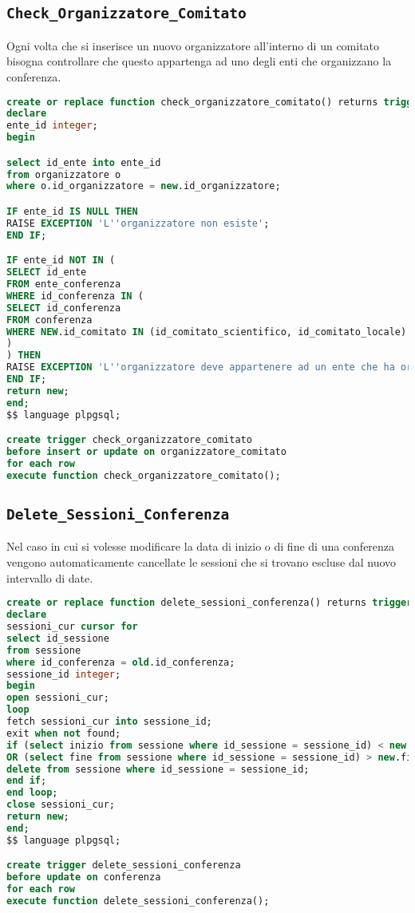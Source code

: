 \subsection{\texttt{Check\_Organizzatore\_Comitato}}
Ogni volta che si inserisce un nuovo organizzatore all'interno di un comitato bisogna controllare che questo appartenga ad uno degli enti che organizzano la conferenza.
\begin{lstlisting}[language=SQL, style=mystyle, caption={\texttt{Check\_organizzatori\_comitato}}]
create or replace function check_organizzatore_comitato() returns trigger as $$
declare
ente_id integer;
begin

select id_ente into ente_id
from organizzatore o
where o.id_organizzatore = new.id_organizzatore;

IF ente_id IS NULL THEN
RAISE EXCEPTION 'L''organizzatore non esiste';
END IF;

IF ente_id NOT IN (
SELECT id_ente
FROM ente_conferenza
WHERE id_conferenza IN (
SELECT id_conferenza
FROM conferenza
WHERE NEW.id_comitato IN (id_comitato_scientifico, id_comitato_locale)
)
) THEN
RAISE EXCEPTION 'L''organizzatore deve appartenere ad un ente che ha organizzato la conferenza';
END IF;
return new;
end;
$$ language plpgsql;

create trigger check_organizzatore_comitato
before insert or update on organizzatore_comitato
for each row
execute function check_organizzatore_comitato();
\end{lstlisting}
\subsection{\texttt{Delete\_Sessioni\_Conferenza}}
Nel caso in cui si volesse modificare la data di inizio o di fine di una conferenza vengono automaticamente cancellate le sessioni che si trovano escluse dal nuovo intervallo di date.
\begin{lstlisting}[language=SQL, style=mystyle, caption={\texttt{delete\_sessioni\_conferenza}}]
create or replace function delete_sessioni_conferenza() returns trigger as $$
declare
sessioni_cur cursor for 
select id_sessione 
from sessione 
where id_conferenza = old.id_conferenza;
sessione_id integer;
begin
open sessioni_cur;
loop
fetch sessioni_cur into sessione_id;
exit when not found;
if (select inizio from sessione where id_sessione = sessione_id) < new.inizio 
OR (select fine from sessione where id_sessione = sessione_id) > new.fine then
delete from sessione where id_sessione = sessione_id;
end if;
end loop;
close sessioni_cur;
return new;
end;
$$ language plpgsql;

create trigger delete_sessioni_conferenza
before update on conferenza
for each row
execute function delete_sessioni_conferenza();
\end{lstlisting}

